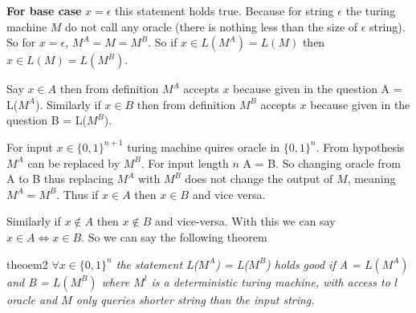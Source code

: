 \documentclass[12pt,a4, onecolumn]{exam}
\begin{document}
\begin{questions}
\begin{solution}
        \textbf{For base case} $x = \epsilon$ this statement holds true. Because for string $\epsilon$ the turing machine $M$ do not call any oracle (there is nothing less than the size of $\epsilon$ string). So for $x = \epsilon$, $M^A = M = M^B$. So if $x \in L(M^A) = L(M)$ then $x \in L(M) = L(M^B)$.

        Say $x \in A$ then from definition $M^A$ accepts $x$ because given in the question A = L($M^A$). Similarly if $x \in B$ then from definition $M^B$ accepts $x$ because given in the question B = L($M^B$).

        For input $x \in \{0, 1\}^{n + 1}$ turing machine quires oracle in $\{0, 1\}^n$. From hypothesis $M^A$ can be replaced by $M^B$. For input length $n$ A = B. So changing oracle from A to B thus replacing $M^A$ with $M^B$ does not change the output of $M$, meaning $M^A = M^B$. Thus if $x \in A$ then $x \in B$ and vice versa. 
        
        Similarly if $x \notin A$ then $x \notin B$ and vice-versa. With this we can say $x \in A \iff x \in B$. So we can say the following theorem

        \begin{theo}{}{theoem2}
          \textit{$\forall x \in \{0, 1\}^{n}$ the statement L($M^{A}$) = L($M^{B}$) holds good if A = $L(M^A)$ and B = $L(M^B)$ where $M^l$ is a deterministic turing machine, with access to $l$ oracle and $M$ only queries shorter string than the input string.}
        \end{theo}
    \end{solution}
\end{questions}
\end{document}
